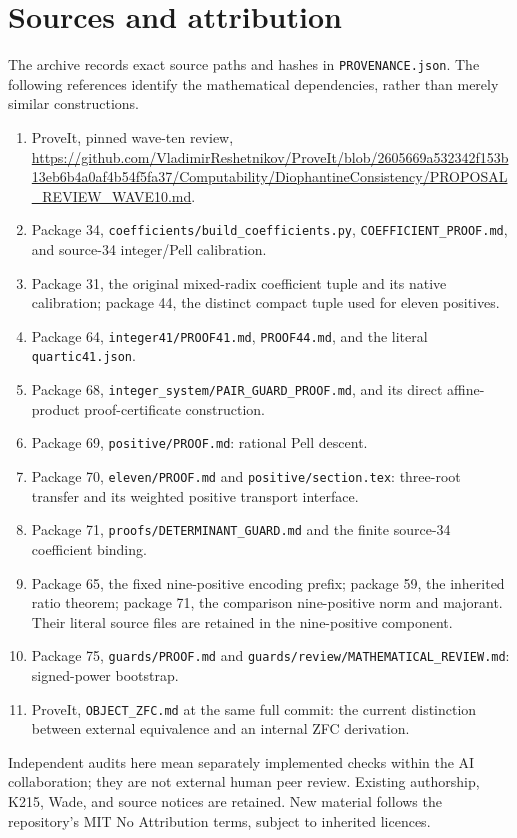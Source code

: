 \documentclass[11pt]{article}
\begin{document}
\section{Sources and attribution}
The archive records exact source paths and hashes in
\texttt{PROVENANCE.json}. The following references identify the mathematical
dependencies, rather than merely similar constructions.
\begin{enumerate}[leftmargin=*]
\item ProveIt, pinned wave-ten review,
\url{https://github.com/VladimirReshetnikov/ProveIt/blob/2605669a532342f153b13eb6b4a0af4b54f5fa37/Computability/DiophantineConsistency/PROPOSAL_REVIEW_WAVE10.md}.
\item Package 34, \texttt{coefficients/build\_coefficients.py},
\texttt{COEFFICIENT\_PROOF.md}, and source-34 integer/Pell calibration.
\item Package 31, the original mixed-radix coefficient tuple and its native
calibration; package 44, the distinct compact tuple used for eleven positives.
\item Package 64, \texttt{integer41/PROOF41.md}, \texttt{PROOF44.md}, and
the literal \texttt{quartic41.json}.
\item Package 68, \texttt{integer\_system/PAIR\_GUARD\_PROOF.md},
and its direct affine-product proof-certificate construction.
\item Package 69, \texttt{positive/PROOF.md}: rational Pell descent.
\item Package 70, \texttt{eleven/PROOF.md} and
\texttt{positive/section.tex}: three-root transfer and its weighted
positive transport interface.
\item Package 71, \texttt{proofs/DETERMINANT\_GUARD.md} and the finite
source-34 coefficient binding.
\item Package 65, the fixed nine-positive encoding prefix; package 59,
the inherited ratio theorem; package 71, the comparison nine-positive norm
and majorant. Their literal source files are retained in the nine-positive
component.
\item Package 75, \texttt{guards/PROOF.md} and
\texttt{guards/review/MATHEMATICAL\_REVIEW.md}: signed-power bootstrap.
\item ProveIt, \texttt{OBJECT\_ZFC.md} at the same full commit: the current
distinction between external equivalence and an internal ZFC derivation.
\end{enumerate}
Independent audits here mean separately implemented checks within the AI
collaboration; they are not external human peer review. Existing authorship,
K215, Wade, and source notices are retained. New material follows the
repository's MIT No Attribution terms, subject to inherited licences.
\end{document}
